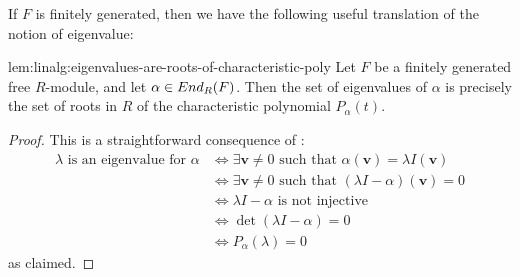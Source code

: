 If $F$ is finitely generated, then we have the following useful
translation of the notion of eigenvalue:
\begin{lem}{}{lem:linalg:eigenvalues-are-roots-of-characteristic-poly}
  Let $F$ be a finitely generated free $R$-module, and let
  $\alpha \in End_R(F)$. Then the set of eigenvalues of $\alpha$ is
  precisely the set of roots in $R$ of the characteristic polynomial
  $P_\alpha(t)$.
\end{lem}
\begin{proof}
  This is a straightforward consequence of :
  \[
    \begin{aligned}
      \lambda \text{ is an eigenvalue for } \alpha
      &\iff \exists \mathbf{v} \neq 0 \text{ such that }
        \alpha(\mathbf{v}) = \lambda I(\mathbf{v}) \\
      &\iff \exists \mathbf{v} \neq 0 \text{ such that }
        (\lambda I - \alpha)(\mathbf{v}) = 0 \\
      &\iff \lambda I - \alpha \text{ is not injective} \\
      &\iff \det(\lambda I - \alpha) = 0 \\
      &\iff P_\alpha(\lambda) = 0
    \end{aligned}
  \]
  as claimed.
\end{proof}

